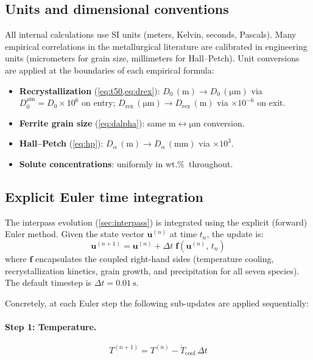 \documentclass[11pt,a4paper]{article}
\begin{document}
\subsection{Units and dimensional conventions}

All internal calculations use SI units (meters, Kelvin,
seconds, Pascals).  Many empirical correlations in the metallurgical
literature are calibrated in engineering units (micrometers for grain size,
millimeters for Hall--Petch).  Unit conversions are applied at the boundaries
of each empirical formula:
\begin{itemize}
  \item \textbf{Recrystallization} (\cref{eq:t50,eq:drex}):
    $D_0\,(\mathrm{m}) \to D_0\,(\mathrm{\mu m})$ via
    $D_0^{\mu\mathrm{m}} = D_0 \times 10^6$ on entry;
    $D_\mathrm{rex}\,(\mathrm{\mu m}) \to D_\mathrm{rex}\,(\mathrm{m})$
    via $\times 10^{-6}$ on exit.
  \item \textbf{Ferrite grain size} (\cref{eq:dalpha}):
    same $\mathrm{m} \leftrightarrow \mathrm{\mu m}$ conversion.
  \item \textbf{Hall--Petch} (\cref{eq:hp}):
    $D_\alpha\,(\mathrm{m}) \to D_\alpha\,(\mathrm{mm})$ via $\times 10^3$.
  \item \textbf{Solute concentrations}: uniformly in wt.\%\ throughout.
\end{itemize}

\subsection{Explicit Euler time integration}
\label{sec:euler}

The interpass evolution (\cref{sec:interpass}) is integrated using the
explicit (forward) Euler method.  Given the state vector
$\mathbf{u}^{(n)}$ at time $t_n$, the update is:
\begin{equation}
  \mathbf{u}^{(n+1)} = \mathbf{u}^{(n)}
    + \Delta t\;\mathbf{f}\!\left(\mathbf{u}^{(n)},\, t_n\right)
  \label{eq:euler}
\end{equation}
where $\mathbf{f}$ encapsulates the coupled right-hand sides (temperature
cooling, recrystallization kinetics, grain growth, and precipitation for all
seven species).  The default timestep is $\Delta t = \SI{0.01}{\second}$.

Concretely, at each Euler step the following sub-updates are applied
sequentially:

\paragraph{Step 1: Temperature.}
\begin{equation}
  T^{(n+1)} = T^{(n)} - \dot{T}_\mathrm{cool}\,\Delta t
\end{equation}
\end{document}

